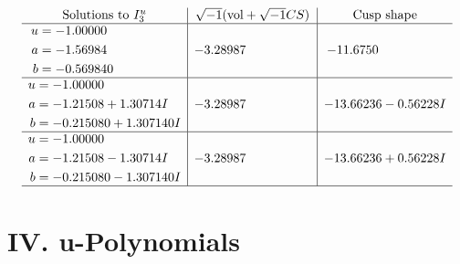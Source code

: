 \documentclass[1p]{elsarticle_modified}
\theoremstyle{definition}
\newcommand{\I}{\sqrt{-1}}
\begin{document}
$$\begin{array}{c|c|c}  
\text{Solutions to }I^u_{3}& \I (\text{vol} + \sqrt{-1}CS) & \text{Cusp shape}\\
 \hline 
\begin{aligned}
u &= -1.00000\phantom{ +0.000000I} \\
a &= -1.56984\phantom{ +0.000000I} \\
b &= -0.569840\phantom{ +0.000000I}\end{aligned}
 & -3.28987\phantom{ +0.000000I} & -11.6750\phantom{ +0.000000I} \\ \hline\begin{aligned}
u &= -1.00000\phantom{ +0.000000I} \\
a &= -1.21508 + 1.30714 I \\
b &= -0.215080 + 1.307140 I\end{aligned}
 & -3.28987\phantom{ +0.000000I} & -13.66236 - 0.56228 I \\ \hline\begin{aligned}
u &= -1.00000\phantom{ +0.000000I} \\
a &= -1.21508 - 1.30714 I \\
b &= -0.215080 - 1.307140 I\end{aligned}
 & -3.28987\phantom{ +0.000000I} & -13.66236 + 0.56228 I\\
 \hline 
 \end{array}$$\newpage
\newpage\renewcommand{\arraystretch}{1}
\centering \section*{ IV. u-Polynomials}
\end{document}
